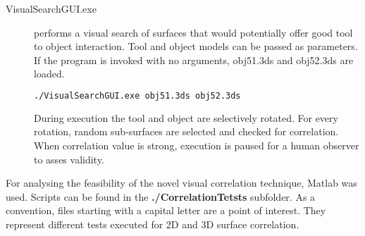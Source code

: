 \documentclass[11]{article}
\begin{document}
\begin{description}
  \item [VisualSearchGUI.exe] performs a visual search of surfaces that would potentially offer good tool to object interaction. Tool and object models can be passed as parameters. If the program is invoked with no arguments, obj51.3ds and obj52.3ds are loaded.
    \begin{lstlisting}[language=bash]
  ./VisualSearchGUI.exe obj51.3ds obj52.3ds
    \end{lstlisting}
    During execution the tool and object are selectively rotated. For every rotation, random sub-surfaces are selected and checked for correlation.
    When correlation value is strong, execution is paused for a human observer to asses validity. 
\end{description}

For analysing the feasibility of the novel visual correlation technique, Matlab was used. 
Scripts can be found in the \textbf{./CorrelationTetsts} subfolder. 
As a convention, files starting with a capital letter are a point of interest.
They represent different tests executed for 2D and 3D surface correlation. 
\end{document}
